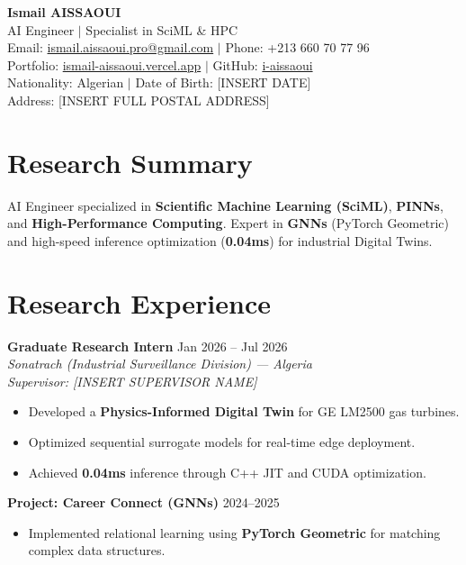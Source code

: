 \documentclass[a4paper,11pt]{article}
\begin{document}
\newpage

\begin{center}
    {\Huge\bfseries\color{titlesaclay} Ismail AISSAOUI}\\[4pt]
    {\large AI Engineer $|$ Specialist in SciML \& HPC}\\[6pt]
    \normalsize
    Email: \href{mailto:ismail.aissaoui.pro@gmail.com}{ismail.aissaoui.pro@gmail.com} $|$ Phone: +213 660 70 77 96 \\
    Portfolio: \href{https://ismail-aissaoui.vercel.app}{ismail-aissaoui.vercel.app} $|$ GitHub: \href{https://github.com/i-aissaoui}{i-aissaoui} \\
    Nationality: Algerian $|$ Date of Birth: [INSERT DATE] \\
    Address: [INSERT FULL POSTAL ADDRESS]
\end{center}

\section{Research Summary}
AI Engineer specialized in \textbf{Scientific Machine Learning (SciML)}, \textbf{PINNs}, and \textbf{High-Performance Computing}. Expert in \textbf{GNNs} (PyTorch Geometric) and high-speed inference optimization (\textbf{0.04ms}) for industrial Digital Twins.

\section{Research Experience}
\textbf{Graduate Research Intern} \hfill Jan 2026 -- Jul 2026 \\
\textit{Sonatrach (Industrial Surveillance Division) — Algeria} \\
\textit{Supervisor: [INSERT SUPERVISOR NAME]}
\begin{itemize}
    \item Developed a \textbf{Physics-Informed Digital Twin} for GE LM2500 gas turbines.
    \item Optimized sequential surrogate models for real-time edge deployment.
    \item Achieved \textbf{0.04ms} inference through C++ JIT and CUDA optimization.
\end{itemize}

\textbf{Project: Career Connect (GNNs)} \hfill 2024--2025 \\
\begin{itemize}
    \item Implemented relational learning using \textbf{PyTorch Geometric} for matching complex data structures.
\end{itemize}
\end{document}
